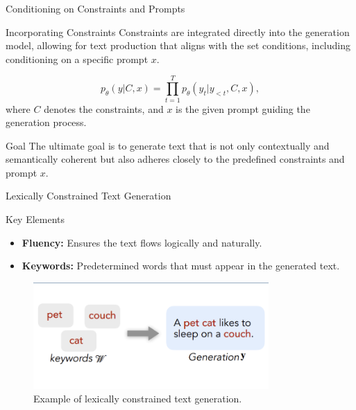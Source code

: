 \documentclass{beamer}
\begin{document}
\begin{frame}{Conditioning on Constraints and Prompts}
    \begin{block}{Incorporating Constraints}
        Constraints are integrated directly into the generation model, allowing for text production that aligns with the set conditions, including conditioning on a specific prompt $x$.
    \end{block}
    \begin{equation}
        p_{\theta} (y|C, x) = \prod_{t=1}^{T} p_{\theta} (y_t | y_{<t}, C, x),
    \end{equation}
    where $C$ denotes the constraints, and $x$ is the given prompt guiding the generation process.
    \begin{block}{Goal}
        The ultimate goal is to generate text that is not only contextually and semantically coherent but also adheres closely to the predefined constraints and prompt $x$.
    \end{block}
\end{frame}

\begin{frame}{Lexically Constrained Text Generation}

    \begin{block}{Key Elements}
        \begin{itemize}
            \item \textbf{Fluency:} Ensures the text flows logically and naturally.
            \item \textbf{Keywords:} Predetermined words that must appear in the generated text.
        \end{itemize}
    \end{block}

    \begin{figure}
        \centering
        \includegraphics[width=0.8\textwidth]{constraint1.png}
        \caption{Example of lexically constrained text generation.}
    \end{figure}
\end{frame}
\end{document}
